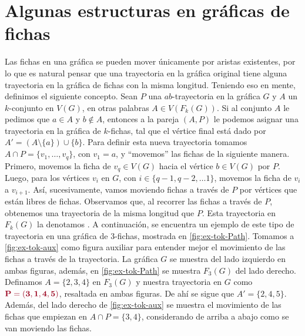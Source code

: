 \section{Algunas estructuras en gr\'aficas de fichas}%
\label{sec:}

Las fichas en una gr\'afica se pueden mover \'unicamente por aristas existentes,
por lo que es natural pensar que una trayectoria en la gr\'afica original tiene
alguna trayectoria en la gr\'afica de fichas con la misma longitud. Teniendo eso
en mente, definimos el siguiente concepto. Sean $P$ una $ab$-trayectoria en la
gr\'afica $G$ y $A$ un $k$-conjunto en $V(G)$, en otras palabras $A \in
V(F_k(G))$. Si al conjunto $A$ le pedimos que $a\in A$ y $b \notin A$, entonces
a la pareja $(A,P)$ le podemos asignar una trayectoria en la gr\'afica de
$k$-fichas, tal que el v\'ertice final est\'a dado por $A'=(A \setminus \{a\})
\cup \{b\}$. Para definir esta nueva trayectoria tomamos $A\cap P =\{v_1, \dots,
v_q\}$, con $v_1 = a$, y ``movemos'' las fichas de la siguiente manera. Primero,
movemos la ficha de $v_q \in V(G)$ hacia el v\'ertice $b \in V(G)$ por $P$.
Luego, para los v\'ertices $v_i$ en $G$, con $i \in \{q-1, q-2, \dots 1\}$,
movemos la ficha de $v_i$ a $v_{i+1}$. As\'i, sucesivamente, vamos moviendo
fichas a trav\'es de $P$ por v\'ertices que est\'an libres de fichas. Observamos
que, al recorrer las fichas a trav\'es de $P$, obtenemos una trayectoria de la
misma longitud que $P$. Esta trayectoria en $F_k(G)$ la denotamos
. A continuaci\'on, se encuentra un
ejemplo de este tipo de trayectoria en una gr\'afica de $3$-fichas, mostrada en
\cref{fig:ex-tok-Path}. Tomamos a \cref{fig:ex-tok-aux} como figura auxiliar
para entender mejor el movimiento de las fichas a trav\'es de la trayectoria. La
gr\'afica $G$ se muestra del lado izquierdo en ambas figuras, adem\'as, en
\cref{fig:ex-tok-Path} se muestra $F_3(G)$ del lado derecho. Definamos
$A=\{2,3,4\}$ en $F_3(G)$ y nuestra trayectoria en $G$ como ${\color{vino}\bf P=
(3,1,4,5)}$, resaltada en ambas figuras. De ah\'i se sigue que $A'=\{2,4,5\}$.
Adem\'as, del lado derecho de \cref{fig:ex-tok-aux} se muestra el movimiento de
las fichas que empiezan en $A \cap P =\{3,4\}$, considerando de arriba a abajo
como se van moviendo las fichas.

